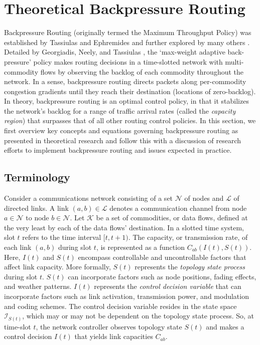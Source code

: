 \documentclass{article}
\begin{document}
\section{Theoretical Backpressure Routing}
\label{sec:theory}

Backpressure Routing (originally termed the Maximum Throughput Policy) was established by Tassiulas and Ephremides \cite{TasEph1992} and further explored by many others \cite{GeoNeeTas2006, NeeUrg2009}.
Detailed by Georgiadis, Neely, and Tassiulas \cite{GeoNeeTas2006}, the `max-weight adaptive back-pressure' policy makes routing decisions in a time-slotted network with multi-commodity flows by observing the backlog of each commodity throughout the network.
In a sense, backpressure routing directs packets along per-commodity congestion gradients until they reach their destination (locations of zero-backlog).
In theory, backpressure routing is an optimal control policy, in that it stabilizes the network's backlog for a range of traffic arrival rates (called the \emph{capacity region}) that surpasses that of all other routing control policies.
In this section, we first overview key concepts and equations governing backpressure routing as presented in theoretical research and follow this with a discussion of research efforts to implement backpressure routing and issues expected in practice.


\subsection{Terminology}\label{sec:theory-terminology}

Consider a communications network consisting of a set \(\mathcal{N}\) of nodes and \(\mathcal{L}\) of directed links.
A link \((a,b) \in \mathcal{L}\) denotes a communication channel from node \(a \in \mathcal{N}\) to node \(b \in \mathcal{N}\).
Let \(\mathcal{K}\) be a set of commodities, or data flows, defined at the very least by each of the data flows' destination.
In a slotted time system, slot \(t\) refers to the time interval \([t,t+1)\).
The capacity, or transmission rate, of each link \((a,b)\) during slot \(t\), is represented as a function \(C_{ab}(I(t),S(t))\).
Here, \(I(t)\) and \(S(t)\) encompass controllable and uncontrollable factors that affect link capacity.
More formally, \(S(t)\) represents the \emph{topology state process} during slot \(t\).
\(S(t)\) can incorporate factors such as node positions, fading effects, and weather patterns.
\(I(t)\) represents the \emph{control decision variable} that can incorporate factors such as link activation, transmission power, and modulation and coding schemes.
The control decision variable resides in the state space \(\mathcal{I}_{S(t)}\), which may or may not be dependent on the topology state process.
So, at time-slot \(t\), the network controller observes topology state \(S(t)\) and makes a control decision \(I(t)\) that yields link capacities \(C_{ab}\).
\end{document}
